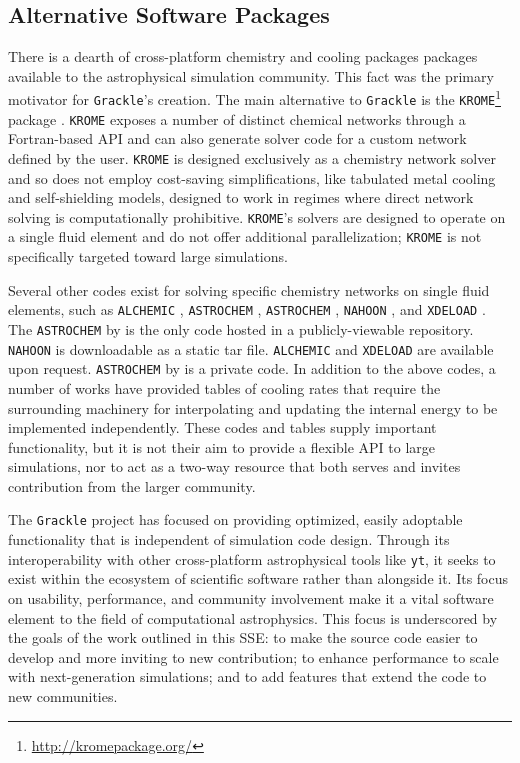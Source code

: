 \documentclass[11pt]{article}
\newcommand{\grackle}{\texttt{Grackle}}
\newcommand{\yt}{\texttt{yt}}
\begin{document}
\begin{flushleft}
\subsection{Alternative Software Packages}

There is a dearth of cross-platform chemistry and cooling packages 
packages available to the astrophysical simulation community.  This
fact was the primary motivator for \grackle{}'s creation.  The main
alternative to \grackle{} is the 
\texttt{KROME}\footnote{\url{http://kromepackage.org/}} package
\citep{2014MNRAS.439.2386G}.  \texttt{KROME} exposes a number of
distinct chemical networks through a Fortran-based API and can also
generate solver code for a custom network defined by the user.
\texttt{KROME} is designed exclusively as a chemistry network solver
and so does not employ cost-saving simplifications, like tabulated
metal cooling and self-shielding models, designed to work in regimes
where direct network solving is computationally prohibitive.
\texttt{KROME}'s solvers are designed to operate on a single fluid
element and do not offer additional parallelization; \texttt{KROME} is
not specifically targeted toward large simulations.

Several other codes exist for solving specific chemistry
networks on single fluid elements, such as 
\texttt{ALCHEMIC} \citep{2010A&A...522A..42S}, \texttt{ASTROCHEM}
\citep{2013MNRAS.431..455K}, \texttt{ASTROCHEM} \citep[][unrelated to
the first \texttt{ASTROCHEM}]{2013A&A...559A..53M}, \texttt{NAHOON}
\citep{2012ApJS..199...21W}, and \texttt{XDELOAD}
\citep{2005Ap&SS.299....1N}.  The \texttt{ASTROCHEM} by
\citet{2013A&A...559A..53M} is the only code hosted in a
publicly-viewable repository.  \texttt{NAHOON} is downloadable as a
static tar file.  \texttt{ALCHEMIC} and \texttt{XDELOAD} are available
upon request.  \texttt{ASTROCHEM} by \citet{2013MNRAS.431..455K} is a
private code.
In addition to the above codes, a number of works have provided tables
of cooling rates \citep{1993ApJS...88..253S, 2009MNRAS.393...99W,
2013MNRAS.434.1043O} that require the surrounding machinery for
interpolating and updating the internal energy to be implemented
independently.
These codes and tables supply important functionality, but it is
not their aim to provide a flexible API to large simulations, nor to
act as a two-way resource that both serves and invites contribution
from the larger community.

The \grackle{} project has focused on providing optimized, easily
adoptable functionality that is independent of simulation code
design.  Through its interoperability with other cross-platform
astrophysical tools like \yt{}, it seeks to exist within the
ecosystem of scientific software rather than alongside it.
Its focus on usability, performance, and community
involvement make it a vital software element to the field of
computational astrophysics.  This focus is underscored by the goals
of the work outlined in this SSE:
to make the source code easier to develop and more inviting to new
contribution; to enhance performance to scale with next-generation
simulations; and to add features that extend the code to new
communities.


\end{flushleft}
\end{document}
